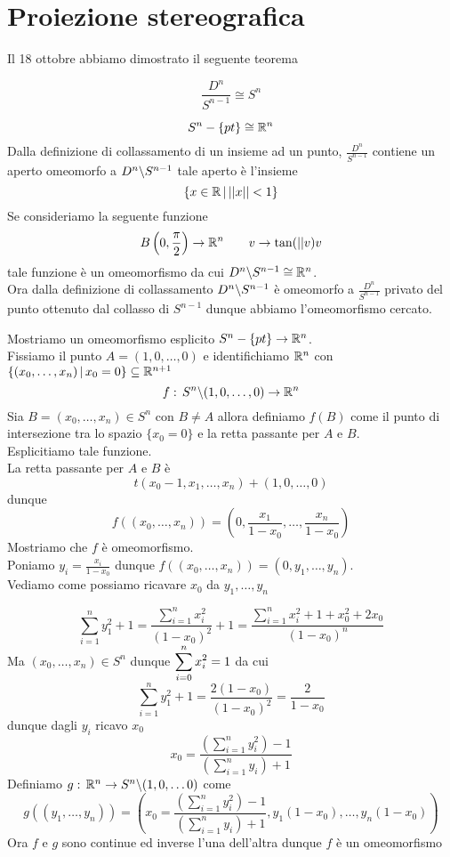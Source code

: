 \section{Proiezione stereografica}
Il 18 ottobre abbiamo dimostrato il seguente teorema
\begin{thm}$$ \frac{D^n}{S^{n-1}}\cong S^n$$
\end{thm}
\begin{cor}$$S^n - \{ pt \} \cong \mathbb{R}^n$$
\proof Dalla definizione di collassamento di un insieme ad un punto, $\frac{D^n}{S^{n-1}}$ contiene un aperto omeomorfo a $D^n \backslash S^{n-1}$ tale aperto \`e l'insieme 
$$ \{ x \in \mathbb{R} \, \vert \, \vert \vert x \vert \vert < 1\} $$
Se consideriamo la seguente funzione 
$$ B\left( 0 , \frac{\pi}{2} \right) \to \mathbb{R}^n \qquad v \to \tan ( \vert \vert v ) v $$ 
tale funzione \`e un omeomorfismo da cui $D^n \backslash S^{n-1} \cong \mathbb{R}^n $.\\
Ora dalla definizione di collassamento $D^n \backslash S^{n-1}$ \`e omeomorfo a $\frac{D^n}{S^{n-1}}$ privato del punto ottenuto dal collasso di $S^{n-1}$ dunque abbiamo l'omeomorfismo cercato. \endproof
\end{cor}
\spazio
Mostriamo un omeomorfismo esplicito  $S^n - \{ pt \} \to \mathbb{R}^n$.\\
Fissiamo il punto $A=(1, 0, \dots, 0)$ e identifichiamo $\mathbb{R}^n$ con $\{ (x_0, \dots, x_n) \, \vert \, x_0=0 \}\subseteq \mathbb{R}^{n+1}$
$$ f:\, S^n \backslash (1, 0, \dots, 0) \to \mathbb{R}^n$$
Sia $B=(x_0, \dots, x_n) \in S^n$ con $B\neq A $ allora definiamo $f(B)$ come  il punto di intersezione tra lo spazio $\{ x_0 =0\}$ e la retta passante per $A$  e $B$.\\
Esplicitiamo tale funzione.\\
La retta passante per $A$ e $B$ \`e 
$$ t(x_0-1, x_1, \dots, x_n) + ( 1, 0, \dots, 0)$$ dunque 
$$ f((x_0, \dots, x_n)) = \left( 0, \frac{x_1}{1-x_0}, \dots, \frac{x_n}{1-x_0}\right)$$
Mostriamo che $f$ \`e omeomorfismo.\\
Poniamo $y_i= \frac{x_i}{1-x_0}$ dunque  $f((x_0, \dots, x_n)) = (0, y_1, \dots, y_n )$.\\
Vediamo come possiamo ricavare $x_0$ da $y_1, \dots, y_n$

$$ \sum_{i=1}^n y_1^2+1 = \frac{\sum_{i=1}^n x_i^2}{(1-x_0)^2}+1 = \frac{\sum_{i=1}^n x_i^2+1 +x_0^2 +2x_0}{(1-x_0)^n}$$
Ma $(x_0, \dots, x_n) \in S^n$ dunque $\displaystyle \sum_{i=0}^n x_i ^2 =1$ da cui
$$ \sum_{i=1}^n y_1^2+1 = \frac{2(1-x_0)}{(1-x_0)^2}=\frac{2}{1-x_0}$$
dunque dagli $y_i$ ricavo $x_0$ 
$$ x_0 = \frac{\left( \sum_{i=1}^n y_i^2\right)-1}{\left( \sum_{i=1}^n y_i \right) +1}$$
Definiamo $g: \, \mathbb{R}^n \to S^n \backslash (1, 0, \dots 0)$  come 
$$ g( (y_1, \dots, y_n)) = \left(   x_0 = \frac{\left( \sum_{i=1}^n y_i^2\right)-1}{\left( \sum_{i=1}^n y_i \right) +1}, y_1(1-x_0), \dots, y_n (1-x_0) \right)$$
Ora $f$ e $g$ sono continue ed inverse l'una dell'altra dunque $f$ \`e un omeomorfismo 
\newpage
